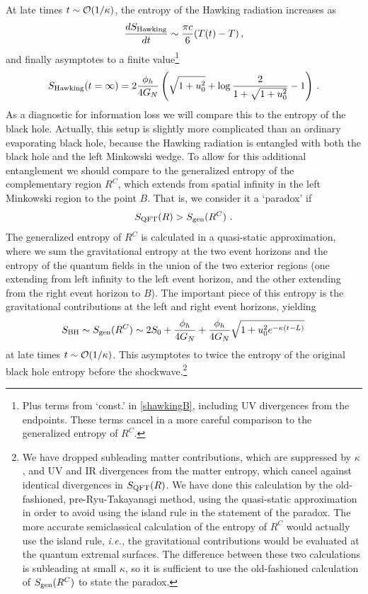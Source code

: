 \documentclass[11pt,oneside,letterpaper]{article}
\newcommand{\p}{\partial}
\newcommand{\f}{\frac}
\newcommand{\be}{\begin{equation}}
\newcommand{\ee}{\end{equation}}
\def\be{\begin{eqnarray}}
\def\ee{\end{eqnarray}}
\let\l=\lambda \let\m=\mu \let\n=\nu \let\x=\xi \let\p=\phi \let\r=v
\let\f=\frac
\def\be{\begin{equation}}
\def\ee{\end{equation}}
\def\ba{\begin{eqnarray}}
\def\ea{\end{eqnarray}}
\renewcommand{\p}{\partial}
\numberwithin{equation}{section}
\def\m{{\mu}}
\def\n{{\nu}}
\def\p{{\phi}}
\def\s{\sqrt}
\def\CO{{\cal O}}
\def\be{\begin{equation}}
\def\ee{\end{equation}}
\def\ba{\begin{eqnarray}}
\def\ea{\end{eqnarray}}
\def\r{\rightarrow}
\def\f {\frac}
\def\l{\left}
\def\r{\right}
\def\x{\bar{x}}
\def \be {\begin{equation}}
\def \ee {\end{equation}}
\renewcommand{\p}{\partial}
\newcommand{\Smatter}{S_{\rm QFT}}
\begin{document}
\begin{spacing}{1.1}
At late  times $t\sim\CO(1/\kappa)$, the entropy of the Hawking radiation increases as
  \ba
    \f{dS_{\rm Hawking}}{dt}\sim \f{\pi c}{6} (T(t)-T)\, ,%
    \ea
    and finally asymptotes to a finite value\footnote{Plus terms from `const.' in \eqref{shawkingB}, including UV divergences from the endpoints. These terms cancel in a more careful comparison to the generalized entropy of $R^C$.}
    \ba
      S_{\rm Hawking}(t=\infty)=%
      2\f{\phi_h}{4G_N}\l(\s{1+u^2_0}+\log\f{2}{1+\s{1+u_0^2}}-1\r)\, .
    \ea
As a diagnostic for information loss we will compare this to the entropy of the black hole. Actually, this setup is slightly more complicated than an ordinary evaporating black hole, because the Hawking radiation is entangled with both the black hole and the left Minkowski wedge. To allow for this additional entanglement we should compare to the generalized entropy of the complementary region $R^C$, which extends from spatial infinity in the left Minkowski region to the point $B$. That is, we consider it a `paradox' if 
\be
\Smatter(R) > S_{\rm gen}(R^C) \ .
\ee
The generalized entropy of $R^C$ is calculated in a quasi-static approximation, where we sum the gravitational entropy at the two event horizons and the entropy of the quantum fields in the union of the two exterior regions (one extending from left infinity to the left event horizon, and the other extending from the right event horizon to $B$). The important piece of this entropy is the gravitational contributions at the left and right event horizons, yielding
\ba\label{sbhii}
S_{\rm BH} \sim S_{\rm gen}(R^C) \sim 2S_0+  \f{\phi_h}{4G_N}+\f{\phi_h}{4G_N}\s{1+u_0^2e^{-\kappa (t-L)}}\, 
\ea
at late times $t\sim\CO(1/\kappa)$. This asymptotes to twice the entropy of the original black hole entropy before the shockwave.\footnote{We have dropped subleading matter contributions, which are suppressed by $\kappa$, and UV and IR divergences from the matter entropy, which cancel against identical divergences in $\Smatter(R)$. We have done this calculation by the old-fashioned, pre-Ryu-Takayanagi method, using the quasi-static approximation in order to avoid using the island rule in the statement of the paradox. The more accurate semiclassical calculation of the entropy of $R^C$ would actually use the island rule, \textit{i.e.,} the gravitational contributions would be evaluated at the quantum extremal surfaces. The difference between these two calculations is subleading at small $\kappa$, so it is sufficient to use the old-fashioned calculation of $S_{\rm gen}(R^C)$ to state the paradox.}


\end{spacing}
\end{document}
